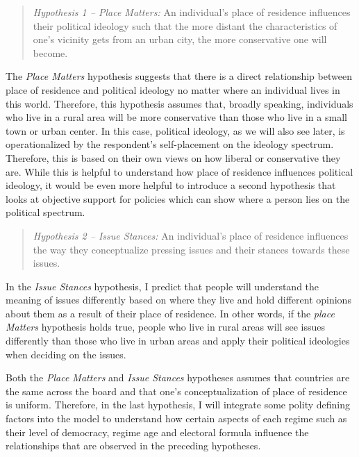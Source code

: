 \documentclass[12pt, titlepage]{article}
\newcommand\e{\emph}
\begin{document}
\begin{quote}
	\e {Hypothesis 1 -- Place Matters:} An individual's place of residence influences their political ideology such that the more distant the characteristics of one's vicinity gets from an urban city, the more conservative one will become.
\end{quote}

The \e{Place Matters} hypothesis suggests that there is a direct relationship between place of residence and political ideology no matter where an individual lives in this world. Therefore, this hypothesis assumes that, broadly speaking, individuals who live in a rural area will be more conservative than those who live in a small town or urban center. In this case, political ideology, as we will also see later, is operationalized by the respondent's self-placement on the ideology spectrum. Therefore, this is based on their own views on how liberal or conservative they are. While this is helpful to understand how place of residence influences political ideology, it would be even more helpful to introduce a second hypothesis that looks at objective support for policies which can show where a person lies on the political spectrum.

\begin{quote}
	\e{Hypothesis 2 -- Issue Stances:} An individual's place of residence influences the way they conceptualize pressing issues and their stances towards these issues.
\end{quote}

In the \e{Issue Stances} hypothesis, I predict that people will understand the meaning of issues differently based on where they live and hold different opinions about them as a result of their place of residence. In other words, if the \e{place Matters} hypothesis holds true, people who live in rural areas will see issues differently than those who live in urban areas and apply their political ideologies when deciding on the issues. 

Both the \e{Place Matters} and \e{Issue Stances} hypotheses assumes that countries are the same across the board and that one's conceptualization of place of residence is uniform. Therefore, in the last hypothesis, I will integrate some polity defining factors into the model to understand how certain aspects of each regime such as their level of democracy, regime age and electoral formula influence the relationships that are observed in the preceding hypotheses. 
\end{document}
